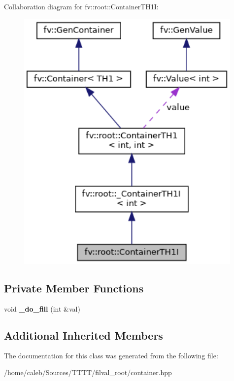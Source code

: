Collaboration diagram for fv\+:\+:root\+:\+:Container\+T\+H1I\+:
\nopagebreak
\begin{figure}[H]
\begin{center}
\leavevmode
\includegraphics[width=314pt]{classfv_1_1root_1_1ContainerTH1I__coll__graph}
\end{center}
\end{figure}
\subsection*{Private Member Functions}
\begin{DoxyCompactItemize}
\item 
\hypertarget{classfv_1_1root_1_1ContainerTH1I_a33ca78d19d5e44f40580105cb0014e04}{}\label{classfv_1_1root_1_1ContainerTH1I_a33ca78d19d5e44f40580105cb0014e04} 
void {\bfseries \+\_\+do\+\_\+fill} (int \&val)
\end{DoxyCompactItemize}
\subsection*{Additional Inherited Members}


The documentation for this class was generated from the following file\+:\begin{DoxyCompactItemize}
\item 
/home/caleb/\+Sources/\+T\+T\+T\+T/filval\+\_\+root/container.\+hpp\end{DoxyCompactItemize}
